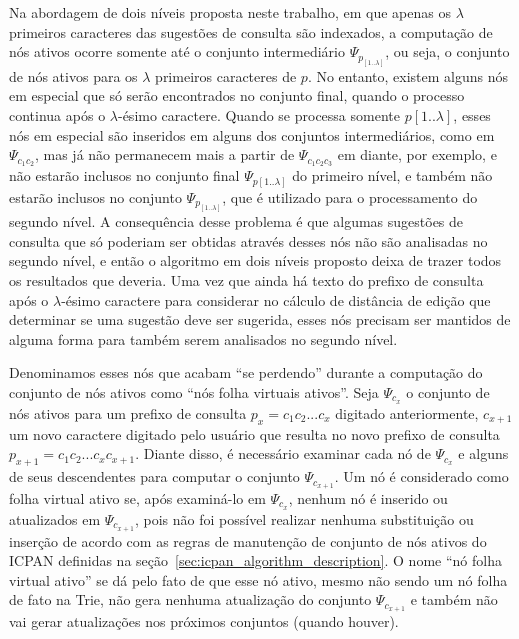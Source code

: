 Na abordagem de dois níveis proposta neste trabalho, em que apenas os $\lambda$ primeiros caracteres das sugestões de consulta são indexados, a computação de nós ativos ocorre somente até o conjunto intermediário $\Psi_{p_[1..\lambda]}$, ou seja, o conjunto de nós ativos para os $\lambda$ primeiros caracteres de $p$. No entanto, existem alguns nós em especial que só serão encontrados no conjunto final, quando o processo continua após o $\lambda$-ésimo caractere. Quando se processa somente $p[1..\lambda]$, esses nós em especial são inseridos em alguns dos conjuntos intermediários, como em $\Psi_{c_1c_2}$, mas já não permanecem mais a partir de $\Psi_{c_1c_2c_3}$ em diante, por exemplo, e não estarão inclusos no conjunto final $\Psi_{p[1..\lambda]}$ do primeiro nível, e também não estarão inclusos no conjunto $\Psi_{p_[1..\lambda]}$, que é utilizado para o processamento do segundo nível. A consequência desse problema é que algumas sugestões de consulta que só poderiam ser obtidas através desses nós não são analisadas no segundo nível, e então o algoritmo em dois níveis proposto deixa de trazer todos os resultados que deveria. Uma vez que ainda há texto do prefixo de consulta após o $\lambda$-ésimo caractere para considerar no cálculo de distância de edição que determinar se uma sugestão deve ser sugerida, esses nós precisam ser mantidos de alguma forma para também serem analisados no segundo nível.

Denominamos esses nós que acabam ``se perdendo'' durante a computação do conjunto de nós ativos como ``nós folha virtuais ativos''. Seja $\Psi_{c_{x}}$ o conjunto de nós ativos para um prefixo de consulta $p_{x} = c_1c_2...c_{x}$ digitado anteriormente, $c_{x+1}$ um novo caractere digitado pelo usuário que resulta no novo prefixo de consulta $p_{x+1} = c_1c_2...c_{x}c_{x + 1}$. Diante disso, é necessário examinar cada nó de $\Psi_{c_{x}}$ e alguns de seus descendentes para computar o conjunto $\Psi_{c_{x + 1}}$. Um nó é considerado como folha virtual ativo se, após examiná-lo em $\Psi_{c_{x}}$, nenhum nó é inserido ou atualizados em $\Psi_{c_{x + 1}}$, pois não foi possível realizar nenhuma substituição ou inserção de acordo com as regras de manutenção de conjunto de nós ativos do ICPAN definidas na seção~\ref{sec:icpan_algorithm_description}. O nome ``nó folha virtual ativo'' se dá pelo fato de que esse nó ativo, mesmo não sendo um nó folha de fato na Trie, não gera nenhuma atualização do conjunto $\Psi_{c_{x + 1}}$ e também não vai gerar atualizações nos próximos conjuntos (quando houver).

